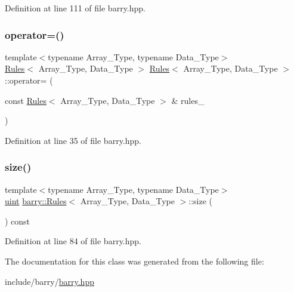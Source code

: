 Definition at line 111 of file barry.\+hpp.

\mbox{\label{classbarry_1_1_rules_ab87544febb8301772164570708bd708e}} 
\subsubsection{\texorpdfstring{operator=()}{operator=()}}
{\footnotesize\ttfamily template$<$typename Array\+\_\+\+Type, typename Data\+\_\+\+Type$>$ \\
\hyperlink{classbarry_1_1_rules}{Rules}$<$ Array\+\_\+\+Type, Data\+\_\+\+Type $>$ \hyperlink{classbarry_1_1_rules}{Rules}$<$ Array\+\_\+\+Type, Data\+\_\+\+Type $>$\+::operator= (\begin{DoxyParamCaption}\item[{const \hyperlink{classbarry_1_1_rules}{Rules}$<$ Array\+\_\+\+Type, Data\+\_\+\+Type $>$ \&}]{rules\+\_\+ }\end{DoxyParamCaption})}



Definition at line 35 of file barry.\+hpp.

\mbox{\label{classbarry_1_1_rules_a590fd2603dd686e91e33330529ab8e77}} 
\subsubsection{\texorpdfstring{size()}{size()}}
{\footnotesize\ttfamily template$<$typename Array\+\_\+\+Type, typename Data\+\_\+\+Type$>$ \\
\hyperlink{namespacebarry_a11dfc53ddb4672278319aa04f1e09a6c}{uint} \hyperlink{classbarry_1_1_rules}{barry\+::\+Rules}$<$ Array\+\_\+\+Type, Data\+\_\+\+Type $>$\+::size (\begin{DoxyParamCaption}{ }\end{DoxyParamCaption}) const\hspace{0.3cm}{\ttfamily [inline]}}



Definition at line 84 of file barry.\+hpp.



The documentation for this class was generated from the following file\+:\begin{DoxyCompactItemize}
\item 
include/barry/\hyperlink{barry_8hpp}{barry.\+hpp}\end{DoxyCompactItemize}
